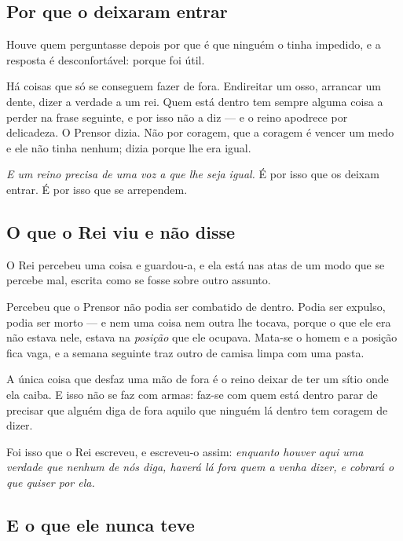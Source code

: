 \documentclass[livro.tex]{subfiles}
\begin{document}
\subsection*{Por que o deixaram entrar}

Houve quem perguntasse depois por que é que ninguém o tinha impedido, e a resposta é
desconfortável: porque foi útil.

\medskip

Há coisas que só se conseguem fazer de fora. Endireitar um osso, arrancar um dente, dizer a
verdade a um rei. Quem está dentro tem sempre alguma coisa a perder na frase seguinte, e por isso
não a diz --- e o reino apodrece por delicadeza. O Prensor dizia. Não por coragem, que a coragem é
vencer um medo e ele não tinha nenhum; dizia porque lhe era igual.

\medskip

\emph{E um reino precisa de uma voz a que lhe seja igual.} É por isso que os deixam entrar. É por
isso que se arrependem.

\subsection*{O que o Rei viu e não disse}

O Rei percebeu uma coisa e guardou-a, e ela está nas atas de um modo que se percebe mal, escrita
como se fosse sobre outro assunto.

\medskip

Percebeu que o Prensor não podia ser combatido de dentro. Podia ser expulso, podia ser morto ---
e nem uma coisa nem outra lhe tocava, porque o que ele era não estava nele, estava na \emph{posição}
que ele ocupava. Mata-se o homem e a posição fica vaga, e a semana seguinte traz outro de camisa
limpa com uma pasta.

\medskip

A única coisa que desfaz uma mão de fora é o reino deixar de ter um sítio onde ela caiba. E isso
não se faz com armas: faz-se com quem está dentro parar de precisar que alguém diga de fora aquilo
que ninguém lá dentro tem coragem de dizer.

\medskip

Foi isso que o Rei escreveu, e escreveu-o assim: \emph{enquanto houver aqui uma verdade que
nenhum de nós diga, haverá lá fora quem a venha dizer, e cobrará o que quiser por ela.}

\subsection*{E o que ele nunca teve}
\end{document}

